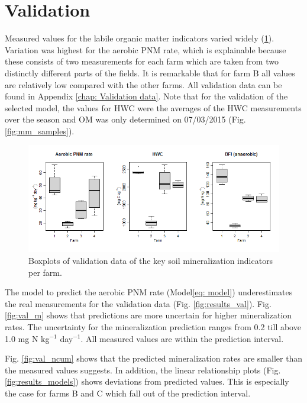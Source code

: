 \documentclass[10pt,twoside,dutch,english]{report}
\begin{document}
\section{Validation}
Measured values for the labile organic matter indicators varied widely (\ref{fig:results_valbox}). Variation was highest for the aerobic PNM rate, which is explainable because these consists of two measurements for each farm which are taken from two distinctly different parts of the fields. It is remarkable that for farm B all values are relatively low compared with the other farms. All validation data can be found in Appendix \ref{chap: Validation data}.
Note that for the validation of the selected model, the values for HWC were the averages of the HWC measurements over the season and OM was only determined on 07/03/2015 (Fig. \ref{fig:mm_samples}).

	\begin{figure}[ht] %
		\centering
		\includegraphics[width=1\linewidth]{results_valbox}
		\caption{Boxplots of validation data of the key soil mineralization indicators per farm.}
		\label{fig:results_valbox}
	\end{figure}

The model to predict the aerobic PNM rate (Model\ref{eq: model}) underestimates the real measurements for the validation data (Fig. \ref{fig:results_val}).  
Fig. \ref{fig:val_m} shows that predictions are more uncertain for higher mineralization rates. The uncertainty for the mineralization prediction ranges from 0.2 till above 1.0 mg N kg$^{-1}$ day$^{-1}$.   All measured values are within the prediction interval. 

Fig. \ref{fig:val_ncum} shows that the predicted mineralization rates are smaller than the measured values suggests.  
In addition, the linear relationship plots (Fig. \ref{fig:results_models}) shows deviations from predicted values. This is especially the case for  farms B and C which fall out of the prediction interval. 
\end{document}
